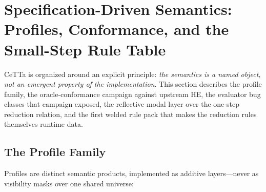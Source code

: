 \documentclass[11pt]{article}
\newcommand{\HE}{\textup{HE}}
\newcommand{\CeTTa}{\textup{CeTTa}}
\begin{document}
\section{Specification-Driven Semantics: Profiles, Conformance, and the
  Small-Step Rule Table}
\label{sec:specdriven}

\CeTTa{} is organized around an explicit principle: \emph{the semantics
is a named object, not an emergent property of the implementation}.
This section describes the profile family, the oracle-conformance
campaign against upstream \HE{}, the evaluator bug classes that
campaign exposed, the reflective modal layer over the one-step
reduction relation, and the first welded rule pack that makes the
reduction rules themselves runtime data.

\subsection{The Profile Family}
\label{sec:profiles}

Profiles are distinct semantic products, implemented as additive
layers---never as visibility masks over one shared universe:
\end{document}
